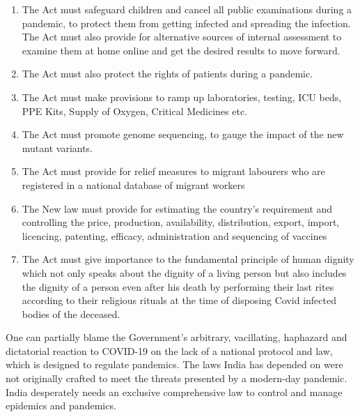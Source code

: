 \begin{multicols}{2}
\begin{enumerate}[label=$\bullet$]
\item The Act must safeguard children and cancel all public examinations during a
pandemic, to protect them from getting infected and spreading the infection. The Act
must also provide for alternative sources of internal assessment to examine them at
home online and get the desired results to move forward.

\item The Act must also protect the rights of patients during a pandemic.

\item The Act must make provisions to ramp up laboratories, testing, ICU beds, PPE Kits,
Supply of Oxygen, Critical Medicines etc.

\item The Act must promote genome sequencing, to gauge the impact of the new mutant
variants.

\item The Act must provide for relief measures to migrant labourers who are registered in a
national database of migrant workers

\item The New law must provide for estimating the country’s requirement and controlling
the price, production, availability, distribution, export, import, licencing, patenting,
efficacy, administration and sequencing of vaccines

\item The Act must give importance to the fundamental principle of human dignity which
not only speaks about the dignity of a living person but also includes the dignity of a
person even after his death by performing their last rites according to their religious
rituals at the time of disposing Covid infected bodies of the deceased.
\end{enumerate}

\vspace{-.5cm}

\noi
One can partially blame the Government’s arbitrary, vacillating, haphazard and dictatorial
reaction to COVID-19 on the lack of a national protocol and law, which is designed to
regulate pandemics. The laws India has depended on were not originally crafted to meet the
threats presented by a modern-day pandemic. India desperately needs an exclusive
comprehensive law to control and manage epidemics and pandemics.

\end{multicols}
\label{end2020-art9}
